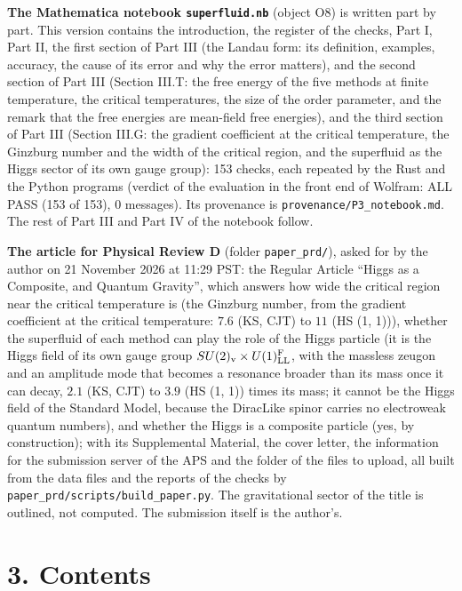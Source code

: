 \documentclass[
  10pt,
]{article}
\begin{document}
\textbf{The Mathematica notebook \texttt{superfluid.nb}} (object O8) is
written part by part. This version contains the introduction, the
register of the checks, Part I, Part II, the first section of Part III
(the Landau form: its definition, examples, accuracy, the cause of its
error and why the error matters), and the second section of Part III
(Section III.T: the free energy of the five methods at finite
temperature, the critical temperatures, the size of the order parameter,
and the remark that the free energies are mean-field free energies), and
the third section of Part III (Section III.G: the gradient coefficient
at the critical temperature, the Ginzburg number and the width of the
critical region, and the superfluid as the Higgs sector of its own gauge
group): 153 checks, each repeated by the Rust and the Python programs
(verdict of the evaluation in the front end of Wolfram: ALL PASS (153 of
153), 0 messages). Its provenance is
\texttt{provenance/P3\_notebook.md}. The rest of Part III and Part IV of
the notebook follow.

\textbf{The article for Physical Review D} (folder
\texttt{paper\_prd/}), asked for by the author on 21 November 2026 at
11:29 PST: the Regular Article ``Higgs as a Composite, and Quantum
Gravity'', which answers how wide the critical region near the critical
temperature is (the Ginzburg number, from the gradient coefficient at
the critical temperature: \(7.6\) (KS, CJT) to \(11\) (HS (1, 1))),
whether the superfluid of each method can play the role of the Higgs
particle (it is the Higgs field of its own gauge group
\(SU(2)_{\rm v}\times U(1)^{\rm F}_{\rm LL}\), with the massless zeugon
and an amplitude mode that becomes a resonance broader than its mass
once it can decay, \(2.1\) (KS, CJT) to \(3.9\) (HS (1, 1)) times its
mass; it cannot be the Higgs field of the Standard Model, because the
DiracLike spinor carries no electroweak quantum numbers), and whether
the Higgs is a composite particle (yes, by construction); with its
Supplemental Material, the cover letter, the information for the
submission server of the APS and the folder of the files to upload, all
built from the data files and the reports of the checks by
\texttt{paper\_prd/scripts/build\_paper.py}. The gravitational sector of
the title is outlined, not computed. The submission itself is the
author's.

\hypertarget{contents}{%
\section{3. Contents}\label{contents}}
\end{document}
